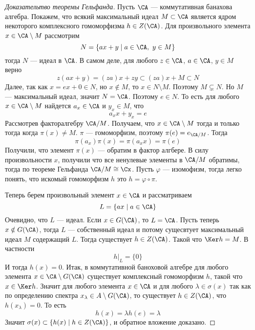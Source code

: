 \begin{proof}[Доказательтво теоремы Гельфанда]
	Пусть $\CA$ --- коммутативная банахова алгебра. Покажем, что всякий максимальный идеал $M \subset \CA$ является ядром некоторого комплексного гомоморфизма $h \in Z(\CA)$. Для произвольного элемента $ x \in \CA\setminus M$ рассмотрим 
	$$
	N = \{ax + y \mid a \in \CA, \ y \in M\}
	$$ 
	тогда $N$ --- идеал в $\CA$. В самом деле, для любого $z \in \CA$, $a \in \CA$, $y \in M$ верно
	$$
	z(ax + y) = (za)x + zy \subset (za)x + M \subset N
	$$
	Далее, так как $x = ex + 0 \in N$, но $x \notin M$, то $x \in N \setminus M$. Поэтому $M \subsetneq N$. Но $M$ --- максимальный идеал, значит $N = \CA$. Поэтому $e \in N$. То есть для любого $x\in \CA\setminus M$ найдется $a_x \in \CA$ и $y_x \in M$, что 
	$$
	a_x x + y_x = e
	$$
	Рассмотрев факторалгебру $\CA / M$. Получаем, что $x \in \CA\setminus M$ тогда и только тогда когда $\pi(x) \neq M$. $\pi$ --- гомоморфизм, поэтому $\pi(e) = e_{\CA / M}$. Тогда 
	$$
	\pi(a_x)\pi(x) = \pi(a_x x) = \pi(e)
	$$
	Получили, что элемент $\pi(x)$ --- обратим в фактор алгбере. В силу произвольности $x$, получили что все ненулевые элементы в $\CA / M$ обратимы, тогда по теореме Гельфанда $\CA / M \cong \Cx$. Пусть $\varphi$ --- изомофизм, тогда легко понять, что искомый гомоморфизм $h$ это $h = \varphi \circ \pi$. 
	
	Теперь берем произвольный элемент $x \in \CA$ и рассматриваем 
	$$
	L = \{a x \mid a \in \CA\}
	$$
	Очевидно, что $L$ --- идеал. Если $x \in G(\CA)$, то $L = \CA$. Пусть теперь $x \notin G(\CA)$, тогда $L$ --- собственный идеал и потому сущесвтует максимальный идеал $M$ содержащий $L$. Тогда существует $h \in Z(\CA)$. Такой что $\Ker h = M$. В частности 
	$$
	h|_L = \{0\}
	$$
	И тогда $h(x) = 0$. Итак, в коммутативной баноховой алгебре для любого элемента $x \in \CA \setminus G(\CA)$ существует комплексный гомоморфизм $h$, такой что $x \in \Ker h$. Значит для любого элемента $x \in \CA$ и для любого $\lambda \in \sigma(x)$ так как по определению спектра $x_\lambda \in A \setminus G(\CA)$, то существует $h \in Z(\CA)$, что $h(x_\lambda) = 0$. То есть 
	$$
	h(x) = \lambda h(e) = \lambda 
	$$
	Значит $\sigma(x) \subset \{h(x) \mid h \in Z(\CA)\}$, и обратное вложение доказано. 
\end{proof}

